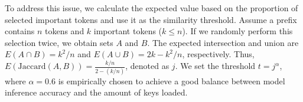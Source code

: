 
%
%


To address this issue, we calculate the expected value based on the proportion of selected important tokens and use it as the similarity threshold. 
Assume a prefix contains \(n\) tokens and \(k\) important tokens (\(k \leq n\)). 
If we randomly perform this selection twice, we obtain sets \(A\) and \(B\). 
The expected intersection and union are \(E(A \cap B) = k^2/n\) and \(E(A \cup B) = 2k - k^2/n\), respectively. 
Thus, \(E(\text{Jaccard}(A, B)) = \frac{k/n}{2 - (k/n)}\), denoted as \(j\). 
We set the threshold \(t = j^\alpha\), where \(\alpha = 0.6\) is empirically chosen to achieve a good balance between model inference accuracy and the amount of keys loaded.
